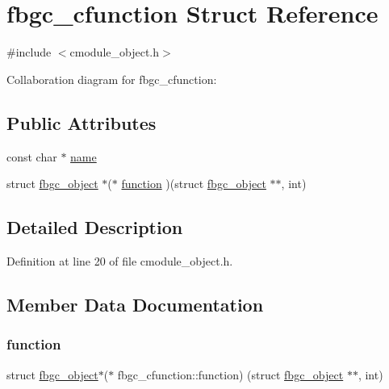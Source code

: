 \hypertarget{structfbgc__cfunction}{}\section{fbgc\+\_\+cfunction Struct Reference}
\label{structfbgc__cfunction}


{\ttfamily \#include $<$cmodule\+\_\+object.\+h$>$}



Collaboration diagram for fbgc\+\_\+cfunction\+:
\subsection*{Public Attributes}
\begin{DoxyCompactItemize}
\item 
const char $\ast$ \hyperlink{structfbgc__cfunction_a6d7ed4017e44902c177a400900cc0844}{name}
\item 
struct \hyperlink{structfbgc__object}{fbgc\+\_\+object} $\ast$($\ast$ \hyperlink{structfbgc__cfunction_ac0e3453edd290577f84f6e9dadb8fcaf}{function} )(struct \hyperlink{structfbgc__object}{fbgc\+\_\+object} $\ast$$\ast$, int)
\end{DoxyCompactItemize}


\subsection{Detailed Description}


Definition at line 20 of file cmodule\+\_\+object.\+h.



\subsection{Member Data Documentation}
\mbox{\label{structfbgc__cfunction_ac0e3453edd290577f84f6e9dadb8fcaf}} 
\subsubsection{\texorpdfstring{function}{function}}
{\footnotesize\ttfamily struct \hyperlink{structfbgc__object}{fbgc\+\_\+object}$\ast$($\ast$  fbgc\+\_\+cfunction\+::function) (struct \hyperlink{structfbgc__object}{fbgc\+\_\+object} $\ast$$\ast$, int)}



